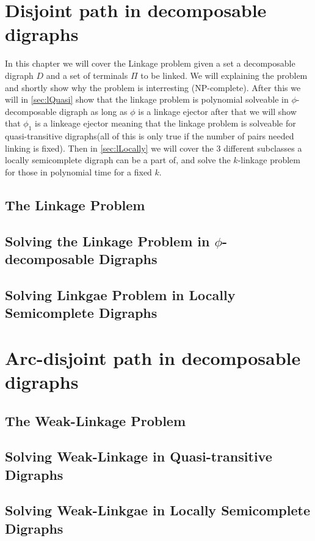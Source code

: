 \chapter{Disjoint path in decomposable digraphs}
\label{chap:linkage}
In this chapter we will cover the Linkage problem given a set a decomposable digraph $D$ and a set of terminals $\Pi$ to be linked. 
We will explaining the problem and shortly show why the problem is interresting (NP-complete). 
After this we will in \autoref{sec:lQuasi} show that the linkage problem is polynomial solveable in $\phi$-decomposable digraph as long as $\phi$ is a linkage ejector after that we will show that $\phi_1$ is a linkeage ejector meaning that the linkage problem is solveable for quasi-transitive digraphs(all of this is only true if the number of pairs needed linking is fixed). Then in \autoref{sec:lLocally} we will cover the 3 different subclasses a locally semicomplete digraph can be a part of, and solve the $k$-linkage problem for those in polynomial time for a fixed $k$. 
\section{The Linkage Problem}
\label{sec:lNP}


\section{Solving the Linkage Problem in $\phi$-decomposable Digraphs}
\label{sec:lQuasi}


\section{Solving Linkgae Problem in Locally Semicomplete Digraphs}
\label{sec:lLocally}



\chapter{Arc-disjoint path in decomposable digraphs}
\label{chap:weak}

\section{The Weak-Linkage Problem}
\label{sec:wNP}


\section{Solving Weak-Linkage in Quasi-transitive Digraphs}
\label{sec:wQuasi}


\section{Solving Weak-Linkgae in Locally Semicomplete Digraphs}
\label{sec:wLocally}


